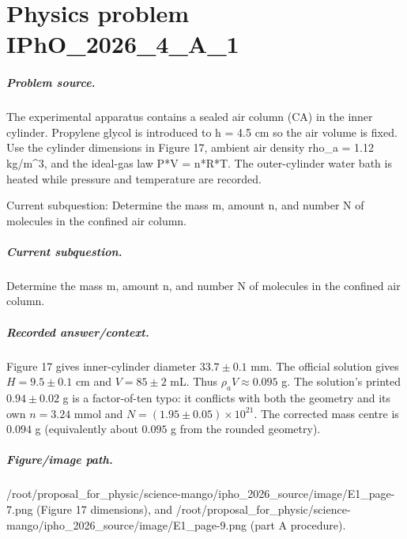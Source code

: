 
\chapter{Physics problem IPhO\_2026\_4\_A\_1}
\label{ch:IPhO2026Problems_problem_IPhO_2026_4_A_1}

\paragraph{Problem source.}
The experimental apparatus contains a sealed air column (CA) in the inner
cylinder.  Propylene glycol is introduced to h = 4.5 cm so the air volume is
fixed.  Use the cylinder dimensions in Figure 17, ambient air density
rho\_a = 1.12 kg/m\textasciicircum{}3, and the ideal-gas law P*V = n*R*T.  The outer-cylinder
water bath is heated while pressure and temperature are recorded.

Current subquestion:
Determine the mass m, amount n, and number N of molecules in the confined air column.

\paragraph{Current subquestion.}
Determine the mass m, amount n, and number N of molecules in the confined air column.

\paragraph{Recorded answer/context.}
Figure 17 gives inner-cylinder diameter \(33.7\pm0.1\) mm.  The official
solution gives \(H=9.5\pm0.1\) cm and \(V=85\pm2\) mL.  Thus
\(\rho_aV\approx0.095\) g.  The solution's printed \(0.94\pm0.02\) g is a
factor-of-ten typo: it conflicts with both the geometry and its own
\(n=3.24\) mmol and \(N=(1.95\pm0.05)\times10^{21}\).  The corrected mass
centre is \(0.094\) g (equivalently about \(0.095\) g from the rounded
geometry).

\paragraph{Figure/image path.}
/root/proposal\_for\_physic/science-mango/ipho\_2026\_source/image/E1\_page-7.png
(Figure 17 dimensions), and
/root/proposal\_for\_physic/science-mango/ipho\_2026\_source/image/E1\_page-9.png
(part A procedure).

